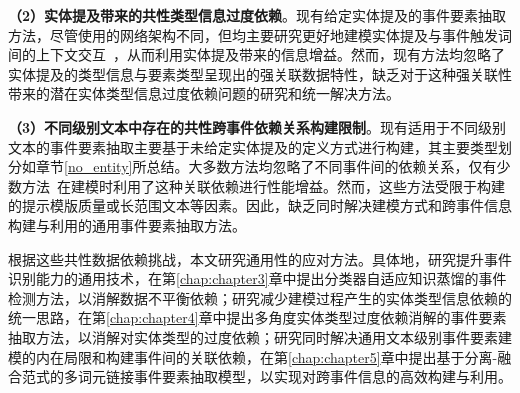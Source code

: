 \textbf{（2）实体提及带来的共性类型信息过度依赖}。现有给定实体提及的事件要素抽取方法，尽管使用的网络架构不同，但均主要研究更好地建模实体提及与事件触发词间的上下文交互~\cite{chen2015event,wang2019hmeae,xiangyu2021capturing}，从而利用实体提及带来的信息增益。然而，现有方法均忽略了实体提及的类型信息与要素类型呈现出的强关联数据特性，缺乏对于这种强关联性带来的潜在实体类型信息过度依赖问题的研究和统一解决方法。

\textbf{（3）不同级别文本中存在的共性跨事件依赖关系构建限制}。现有适用于不同级别文本的事件要素抽取主要基于未给定实体提及的定义方式进行构建，其主要类型划分如章节\ref{no_entity}所总结。大多数方法均忽略了不同事件间的依赖关系，仅有少数方法~\cite{zeng2022ea2e,du2022dynamic,he2023revisiting,li2023intra}在建模时利用了这种关联依赖进行性能增益。然而，这些方法受限于构建的提示模版质量或长范围文本等因素。因此，缺乏同时解决建模方式和跨事件信息构建与利用的通用事件要素抽取方法。

根据这些共性数据依赖挑战，本文研究通用性的应对方法。具体地，研究提升事件识别能力的通用技术，在第\ref{chap:chapter3}章中提出分类器自适应知识蒸馏的事件检测方法，以消解数据不平衡依赖；研究减少建模过程产生的实体类型信息依赖的统一思路，在第\ref{chap:chapter4}章中提出多角度实体类型过度依赖消解的事件要素抽取方法，以消解对实体类型的过度依赖；研究同时解决通用文本级别事件要素建模的内在局限和构建事件间的关联依赖，在第\ref{chap:chapter5}章中提出基于分离-融合范式的多词元链接事件要素抽取模型，以实现对跨事件信息的高效构建与利用。

















































